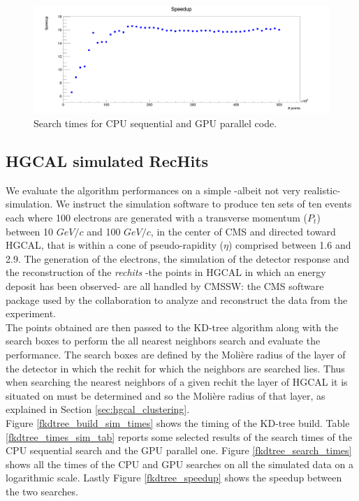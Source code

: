 \begin{figure}
\includegraphics[width=\textwidth]{fkdtree/fixed200/fkdSpeedup.png}
\caption{Search times for CPU sequential and GPU parallel code.}
\label{fkdtree_times_fixedNN_speedup}
\end{figure}

\subsection{HGCAL simulated RecHits}

We evaluate the algorithm performances on a simple -albeit not very realistic- simulation.
We instruct the simulation software to produce ten sets of ten events each where 100 electrons are generated with a transverse momentum ($P_t$) between 10 $\unit{GeV/c}$ and 100 $\unit{GeV/c}$, in the center of CMS and directed toward HGCAL, that is within a cone of pseudo-rapidity ($\eta$) comprised between 1.6 and 2.9.
The generation of the electrons, the simulation of the detector response and the reconstruction of the \textit{rechits} -the points in HGCAL in which an energy deposit has been observed- are all handled by CMSSW: the CMS software package used by the collaboration to analyze and reconstruct the data from the experiment.\\
The points obtained are then passed to the KD-tree algorithm along with the search boxes to perform the all nearest neighbors search and evaluate the performance. The search boxes are defined by the Molière radius of the layer of the detector in which the rechit for which the neighbors are searched lies. Thus when searching the nearest neighbors of a given rechit the layer of HGCAL it is situated on must be determined and so the Molière radius of that layer, as explained in Section \ref{sec:hgcal_clustering}.\\
Figure \ref{fkdtree_build_sim_times} shows the timing of the KD-tree build. Table \ref{fkdtree_times_sim_tab} reports some selected results of the search times of the CPU sequential search and the GPU parallel one. Figure \ref{fkdtree_search_times} shows all the times of the CPU and GPU searches on all the simulated data on a logarithmic scale. Lastly Figure \ref{fkdtree_speedup} shows the speedup between the two searches.\\

